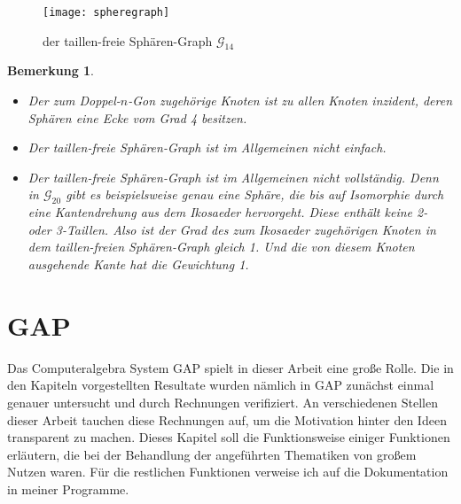 \documentclass[12pt,titlepage,twoside,cleardoublepage]{article}
\theoremstyle{nummermitklammern}
\newtheorem{bemerkung}[temp]{Bemerkung}
\newtheorem{bemerkung}[zahl]{Bemerkung}
\numberwithin{equation}{section}
\begin{document}
 \begin{figure}[H]
\begin{center}
\texttt{[image: spheregraph]}
\end{center}
\caption{der taillen-freie Sphären-Graph $\mathcal{G}_{14}$}
\end{figure}
 \begin{bemerkung}
 \begin{itemize}
 \item Der zum Doppel-$n$-Gon zugehörige Knoten ist zu allen Knoten inzident, deren Sphären eine Ecke vom Grad 4 besitzen.
 \item Der taillen-freie Sphären-Graph ist im Allgemeinen nicht einfach.
 \item Der taillen-freie Sphären-Graph ist im Allgemeinen nicht vollständig. Denn in $\mathcal{G}_{20}$ gibt es beispielsweise genau eine Sphäre, die bis auf Isomorphie durch eine Kantendrehung aus dem Ikosaeder hervorgeht. Diese enthält keine 2- oder 3-Taillen. Also ist der Grad des zum Ikosaeder zugehörigen Knoten in dem taillen-freien Sphären-Graph gleich 1. Und die von diesem Knoten ausgehende Kante hat die Gewichtung 1.
 \end{itemize}
 \end{bemerkung}

\section{GAP}
Das Computeralgebra System GAP spielt in dieser Arbeit eine große Rolle.
Die in den Kapiteln vorgestellten Resultate wurden nämlich in GAP zunächst einmal genauer untersucht und durch Rechnungen verifiziert.
An verschiedenen Stellen dieser Arbeit tauchen diese Rechnungen auf, um die Motivation hinter den Ideen transparent zu machen.
 Dieses Kapitel soll die Funktionsweise einiger Funktionen erläutern, die bei der Behandlung der angeführten Thematiken von großem Nutzen waren. Für die restlichen Funktionen verweise ich auf die Dokumentation in meiner Programme.
\end{document}
